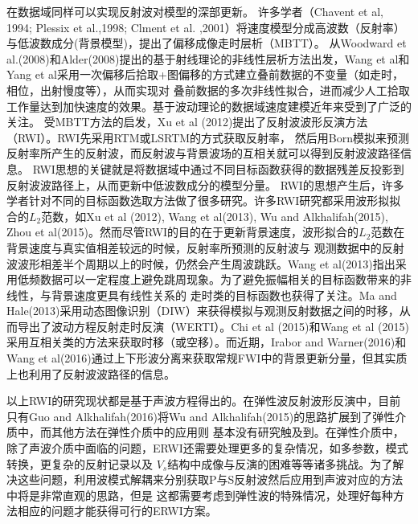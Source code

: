 在数据域同样可以实现反射波对模型的深部更新。
许多学者（Chavent et al, 1994\cite{ChaventEtAl1994}; Plessix et al.,1998\cite{PlessixEtAl1998}; Clment et al.
,2001\cite{ClementEtAl2001}）将速度模型分成高波数（反射率）与低波数成分(背景模型)，提出了偏移成像走时层析（MBTT）。
从Woodward et
al.(2008)\cite{Woodward2008}和Alder(2008)\cite{Adler2008}提出的基于射线理论的非线性层析方法出发，Wang
et al\cite{WangEtAl2014}和Yang et al\cite{YangEtAl2016}采用一次偏移后拾取+图偏移的方式建立叠前数据的不变量（如走时，相位，出射慢度等），从而实现对
叠前数据的多次非线性拟合，进而减少人工拾取工作量达到加快速度的效果。基于波动理论的数据域速度建模近年来受到了广泛的关注。
受MBTT方法的启发，Xu et al (2012)\cite{xu:2012}提出了反射波波形反演方法（RWI）。RWI先采用RTM或LSRTM的方式获取反射率，
然后用Born模拟来预测反射率所产生的反射波，而反射波与背景波场的互相关就可以得到反射波波路径信息。
RWI思想的关键就是将数据域中通过不同目标函数获得的数据残差反投影到反射波波路径上，从而更新中低波数成分的模型分量。
RWI的思想产生后，许多学者针对不同的目标函数选取方法做了很多研究。许多RWI研究都采用波形拟拟合的$L_2$范数，如Xu
et al (2012)\cite{xu:2012}, Wang et al(2013)\cite{Wang2013}, Wu and
Alkhalifah(2015)\cite{Wu2015b},
Zhou et al(2015)\cite{zhou:2015}。然而尽管RWI的目的在于更新背景速度，波形拟合的$L_2$范数在背景速度与真实值相差较远的时候，反射率所预测的反射波与
观测数据中的反射波波形相差半个周期以上的时候，仍然会产生周波跳跃。Wang et
al(2013)\cite{Wang2013}指出采用低频数据可以一定程度上避免跳周现象。为了避免振幅相关的目标函数带来的非线性，与背景速度更具有线性关系的
走时类的目标函数也获得了关注。Ma and
Hale(2013)\cite{ma2013}采用动态图像识别（DIW）来获得模拟与观测反射数据之间的时移，从而导出了波动方程反射走时反演（WERTI）。Chi
et al (2015)\cite{chi2015}和Wang et al
(2015)\cite{Wang2015}采用互相关类的方法来获取时移（或空移）。而近期，Irabor and
Warner(2016)\cite{Irabor2016}和Wang et al(2016)\cite{WangEtAl2016}通过上下形波分离来获取常规FWI中的背景更新分量，但其实质上也利用了反射波波路径的信息。

以上RWI的研究现状都是基于声波方程得出的。在弹性波反射波形反演中，目前只有Guo and
Alkhalifah(2016)\cite{Guo2016}将Wu and
Alkhalifah(2015)\cite{Wu2015b}的思路扩展到了弹性介质中，而其他方法在弹性介质中的应用则
基本没有研究触及到。在弹性介质中，除了声波介质中面临的问题，ERWI还需要处理更多的复杂情况，如多参数，模式转换，更复杂的反射记录以及
$V_s$结构中成像与反演的困难等等诸多挑战。为了解决这些问题，利用波模式解耦来分别获取P与S反射波然后应用到声波对应的方法中将是非常直观的思路，但是
这都需要考虑到弹性波的特殊情况，处理好每种方法相应的问题才能获得可行的ERWI方案。

